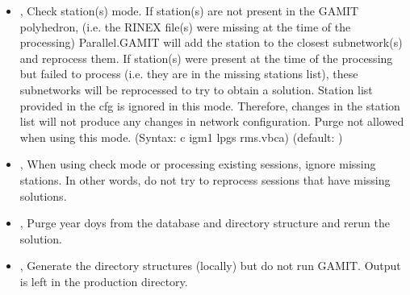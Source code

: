 \documentclass[letterpaper,10pt,english]{sphinxmanual}
\begin{document}
\begin{itemize}
\item {} 
\sphinxAtStartPar
{\hyperref[\detokenize{parallel_gamit:pyParallelGamit.py--c}]{}} , {\hyperref[\detokenize{parallel_gamit:pyParallelGamit.py---check_mode}]{}}  \sphinxhyphen{} Check station(s) mode. If station(s) are not present in the GAMIT polyhedron, (i.e. the RINEX file(s) were missing at the time of the processing) Parallel.GAMIT will add the station to the closest subnetwork(s) and reprocess them. If station(s) were present at the time of the processing but failed to process (i.e. they are in the missing stations list), these subnetworks will be reprocessed to try to obtain a solution. Station list provided in the cfg is ignored in this mode. Therefore, changes in the station list will not produce any changes in network configuration. Purge not allowed when using this mode. (Syntax: \sphinxhyphen{}c igm1 lpgs rms.vbca) (default: )

\item {} 
\sphinxAtStartPar
{\hyperref[\detokenize{parallel_gamit:pyParallelGamit.py--i}]{}}, {\hyperref[\detokenize{parallel_gamit:pyParallelGamit.py---ignore_missing}]{}} \sphinxhyphen{} When using check mode or processing existing sessions, ignore missing stations. In other words, do not try to reprocess sessions that have missing solutions.

\item {} 
\sphinxAtStartPar
{\hyperref[\detokenize{parallel_gamit:pyParallelGamit.py--p}]{}}, {\hyperref[\detokenize{parallel_gamit:pyParallelGamit.py---purge}]{}} \sphinxhyphen{} Purge year doys from the database and directory structure and re\sphinxhyphen{}run the solution.

\item {} 
\sphinxAtStartPar
{\hyperref[\detokenize{parallel_gamit:pyParallelGamit.py--dry}]{}}, {\hyperref[\detokenize{parallel_gamit:pyParallelGamit.py---dry_run}]{}} \sphinxhyphen{} Generate the directory structures (locally) but do not run GAMIT. Output is left in the production directory.


\end{itemize}
\end{document}
